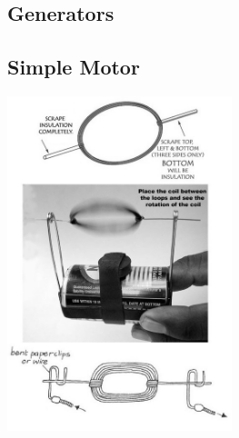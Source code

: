 \begin{multicols}{2}

\section*{Generators}


\subsection{Simple Motor}

\begin{center}
\includegraphics[width=0.49\textwidth]{./img/simple-motor-compile.jpg}
\end{center}


\end{multicols}
